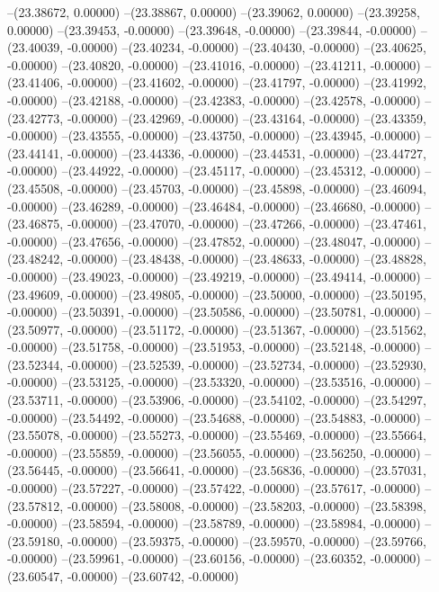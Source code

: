 --(23.38672, 0.00000)
--(23.38867, 0.00000)
--(23.39062, 0.00000)
--(23.39258, 0.00000)
--(23.39453, -0.00000)
--(23.39648, -0.00000)
--(23.39844, -0.00000)
--(23.40039, -0.00000)
--(23.40234, -0.00000)
--(23.40430, -0.00000)
--(23.40625, -0.00000)
--(23.40820, -0.00000)
--(23.41016, -0.00000)
--(23.41211, -0.00000)
--(23.41406, -0.00000)
--(23.41602, -0.00000)
--(23.41797, -0.00000)
--(23.41992, -0.00000)
--(23.42188, -0.00000)
--(23.42383, -0.00000)
--(23.42578, -0.00000)
--(23.42773, -0.00000)
--(23.42969, -0.00000)
--(23.43164, -0.00000)
--(23.43359, -0.00000)
--(23.43555, -0.00000)
--(23.43750, -0.00000)
--(23.43945, -0.00000)
--(23.44141, -0.00000)
--(23.44336, -0.00000)
--(23.44531, -0.00000)
--(23.44727, -0.00000)
--(23.44922, -0.00000)
--(23.45117, -0.00000)
--(23.45312, -0.00000)
--(23.45508, -0.00000)
--(23.45703, -0.00000)
--(23.45898, -0.00000)
--(23.46094, -0.00000)
--(23.46289, -0.00000)
--(23.46484, -0.00000)
--(23.46680, -0.00000)
--(23.46875, -0.00000)
--(23.47070, -0.00000)
--(23.47266, -0.00000)
--(23.47461, -0.00000)
--(23.47656, -0.00000)
--(23.47852, -0.00000)
--(23.48047, -0.00000)
--(23.48242, -0.00000)
--(23.48438, -0.00000)
--(23.48633, -0.00000)
--(23.48828, -0.00000)
--(23.49023, -0.00000)
--(23.49219, -0.00000)
--(23.49414, -0.00000)
--(23.49609, -0.00000)
--(23.49805, -0.00000)
--(23.50000, -0.00000)
--(23.50195, -0.00000)
--(23.50391, -0.00000)
--(23.50586, -0.00000)
--(23.50781, -0.00000)
--(23.50977, -0.00000)
--(23.51172, -0.00000)
--(23.51367, -0.00000)
--(23.51562, -0.00000)
--(23.51758, -0.00000)
--(23.51953, -0.00000)
--(23.52148, -0.00000)
--(23.52344, -0.00000)
--(23.52539, -0.00000)
--(23.52734, -0.00000)
--(23.52930, -0.00000)
--(23.53125, -0.00000)
--(23.53320, -0.00000)
--(23.53516, -0.00000)
--(23.53711, -0.00000)
--(23.53906, -0.00000)
--(23.54102, -0.00000)
--(23.54297, -0.00000)
--(23.54492, -0.00000)
--(23.54688, -0.00000)
--(23.54883, -0.00000)
--(23.55078, -0.00000)
--(23.55273, -0.00000)
--(23.55469, -0.00000)
--(23.55664, -0.00000)
--(23.55859, -0.00000)
--(23.56055, -0.00000)
--(23.56250, -0.00000)
--(23.56445, -0.00000)
--(23.56641, -0.00000)
--(23.56836, -0.00000)
--(23.57031, -0.00000)
--(23.57227, -0.00000)
--(23.57422, -0.00000)
--(23.57617, -0.00000)
--(23.57812, -0.00000)
--(23.58008, -0.00000)
--(23.58203, -0.00000)
--(23.58398, -0.00000)
--(23.58594, -0.00000)
--(23.58789, -0.00000)
--(23.58984, -0.00000)
--(23.59180, -0.00000)
--(23.59375, -0.00000)
--(23.59570, -0.00000)
--(23.59766, -0.00000)
--(23.59961, -0.00000)
--(23.60156, -0.00000)
--(23.60352, -0.00000)
--(23.60547, -0.00000)
--(23.60742, -0.00000)
